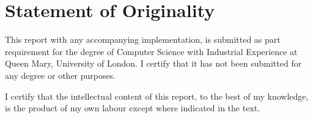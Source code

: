 \section{Statement of Originality}
This report with any accompanying implementation, is submitted as part requirement for the degree of
Computer Science with Industrial Experience at Queen Mary, University of London. I certify that it
has not been submitted for any degree or other purposes.

I certify that the intellectual content of this report, to the best of my knowledge, is the product
of my own labour except where indicated in the text.


\outbpdocument{
    
    
}

